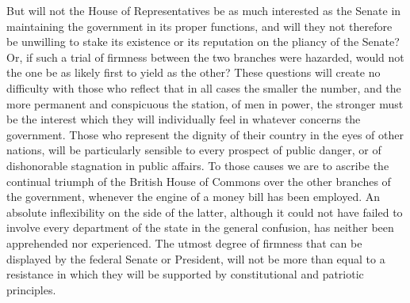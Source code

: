 But will not the House of Representatives be as much interested as the Senate in maintaining the government in its proper functions, and will they not therefore be unwilling to stake its existence or its reputation on the pliancy of the Senate? Or, if such a trial of firmness between the two branches were hazarded, would not the one be as likely first to yield as the other? These questions will create no difficulty with those who reflect that in all cases the smaller the number, and the more permanent and conspicuous the station, of men in power, the stronger must be the interest which they will individually feel in whatever concerns the government. Those who represent the dignity of their country in the eyes of other nations, will be particularly sensible to every prospect of public danger, or of dishonorable stagnation in public affairs. To those causes we are to ascribe the continual triumph of the British House of Commons over the other branches of the government, whenever the engine of a money bill has been employed. An absolute inflexibility on the side of the latter, although it could not have failed to involve every department of the state in the general confusion, has neither been apprehended nor experienced. The utmost degree of firmness that can be displayed by the federal Senate or President, will not be more than equal to a resistance in which they will be supported by constitutional and patriotic principles.

